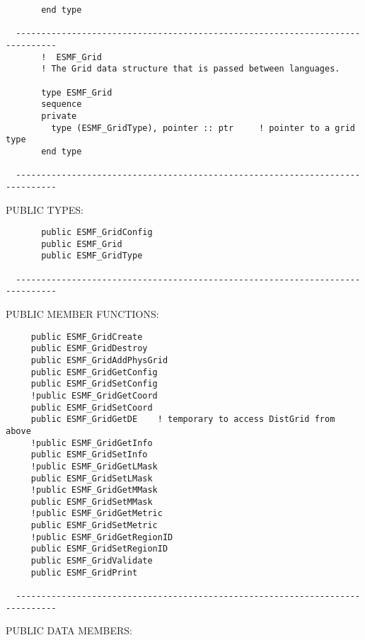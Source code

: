 \begin{verbatim}
       end type
 
  ------------------------------------------------------------------------------
       !  ESMF_Grid
       ! The Grid data structure that is passed between languages.
 
       type ESMF_Grid
       sequence
       private
         type (ESMF_GridType), pointer :: ptr     ! pointer to a grid type
       end type
 
  ------------------------------------------------------------------------------\end{verbatim}{\sf PUBLIC TYPES:}
\begin{verbatim} 
       public ESMF_GridConfig
       public ESMF_Grid
       public ESMF_GridType
 
  ------------------------------------------------------------------------------\end{verbatim}{\sf PUBLIC MEMBER FUNCTIONS:}
\begin{verbatim} 
     public ESMF_GridCreate
     public ESMF_GridDestroy
     public ESMF_GridAddPhysGrid
     public ESMF_GridGetConfig
     public ESMF_GridSetConfig
     !public ESMF_GridGetCoord
     public ESMF_GridSetCoord
     public ESMF_GridGetDE    ! temporary to access DistGrid from above
     !public ESMF_GridGetInfo
     public ESMF_GridSetInfo
     !public ESMF_GridGetLMask
     public ESMF_GridSetLMask
     !public ESMF_GridGetMMask
     public ESMF_GridSetMMask
     !public ESMF_GridGetMetric
     public ESMF_GridSetMetric
     !public ESMF_GridGetRegionID
     public ESMF_GridSetRegionID
     public ESMF_GridValidate
     public ESMF_GridPrint
 
  ------------------------------------------------------------------------------\end{verbatim}{\sf PUBLIC DATA MEMBERS:}

